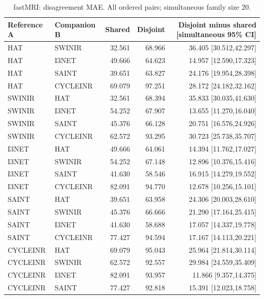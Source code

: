 \begin{table}[t]\centering\small
\caption{fastMRI: disagreement MAE. All ordered pairs; simultaneous family size 20.}
\begin{tabular}{llrrr}\toprule Reference A & Companion B & Shared & Disjoint & Disjoint minus shared [simultaneous 95\% CI]\\\midrule
HAT & SWINIR & 32.561 & 68.966 & 36.405 [30.512,42.297] \\
HAT & I3NET & 49.666 & 64.623 & 14.957 [12.590,17.323] \\
HAT & SAINT & 39.651 & 63.827 & 24.176 [19.954,28.398] \\
HAT & CYCLEINR & 69.079 & 97.251 & 28.172 [24.182,32.162] \\
SWINIR & HAT & 32.561 & 68.394 & 35.833 [30.035,41.630] \\
SWINIR & I3NET & 54.252 & 67.907 & 13.655 [11.270,16.040] \\
SWINIR & SAINT & 45.376 & 66.128 & 20.751 [16.576,24.926] \\
SWINIR & CYCLEINR & 62.572 & 93.295 & 30.723 [25.738,35.707] \\
I3NET & HAT & 49.666 & 64.061 & 14.394 [11.762,17.027] \\
I3NET & SWINIR & 54.252 & 67.148 & 12.896 [10.376,15.416] \\
I3NET & SAINT & 41.630 & 58.546 & 16.915 [14.279,19.552] \\
I3NET & CYCLEINR & 82.091 & 94.770 & 12.678 [10.256,15.101] \\
SAINT & HAT & 39.651 & 63.958 & 24.306 [20.003,28.610] \\
SAINT & SWINIR & 45.376 & 66.666 & 21.290 [17.164,25.415] \\
SAINT & I3NET & 41.630 & 58.688 & 17.057 [14.337,19.778] \\
SAINT & CYCLEINR & 77.427 & 94.594 & 17.167 [14.113,20.221] \\
CYCLEINR & HAT & 69.079 & 95.043 & 25.964 [21.814,30.114] \\
CYCLEINR & SWINIR & 62.572 & 92.557 & 29.984 [24.559,35.409] \\
CYCLEINR & I3NET & 82.091 & 93.957 & 11.866 [9.357,14.375] \\
CYCLEINR & SAINT & 77.427 & 92.818 & 15.391 [12.023,18.758] \\
\bottomrule\end{tabular}\end{table}
